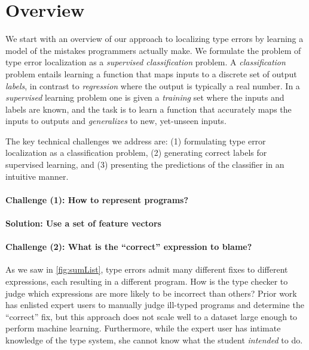 \section{Overview}
\label{sec:overview}

We start with an overview of our approach to localizing type errors by
learning a model of the mistakes programmers actually make.
%
We formulate the problem of type error localization as a
\emph{supervised classification} problem.
%
A \emph{classification} problem entails learning a function that maps
inputs to a discrete set of output \emph{labels}, in contrast to
\emph{regression} where the output is typically a real number.
%
In a \emph{supervised} learning problem one is given a \emph{training}
set where the inputs and labels are known, and the task is to learn a
function that accurately maps the inputs to outputs and
\emph{generalizes} to new, yet-unseen inputs.

The key technical challenges we address are:
%
(1) formulating type error localization as a classification problem,
%
(2) generating correct labels for supervised learning, and
%
(3) presenting the predictions of the classifier in an intuitive manner.

\paragraph{\textbf{Challenge (1): How to represent programs?}}


\paragraph{\textbf{Solution: Use a set of feature vectors}}


\paragraph{\textbf{Challenge (2): What is the ``correct'' expression to blame?}}
As we saw in \autoref{fig:sumList}, type errors admit many different
fixes to different expressions, each resulting in a different program.
%
How is the type checker to judge which expressions are more likely to be
incorrect than others?
%
Prior work has enlisted expert users to manually judge ill-typed
programs and determine the ``correct'' fix, but this approach does not
scale well to a dataset large enough to perform machine learning.
%
Furthermore, while the expert user has intimate knowledge of the type
system, she cannot know what the student \emph{intended} to do.

